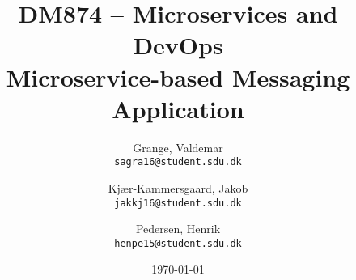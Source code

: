 \documentclass[12pt]{article}
\title{DM874 -- Microservices and DevOps \\ {\large Microservice-based Messaging Application}}
\date{\longdate\today}
\author{
  Grange, Valdemar \\ \texttt{sagra16@student.sdu.dk}
  \and 
  Kjær-Kammersgaard, Jakob \\ \texttt{jakkj16@student.sdu.dk}
  \and 
  Pedersen, Henrik \\ \texttt{henpe15@student.sdu.dk}
}
\begin{document}
\begin{titlepage}
    \begin{center}
        \vspace*{-2cm}\hspace*{1cm}
 
        \vspace{2.5cm}


        {\let\newpage\relax\maketitle}
        \thispagestyle{empty}

        \vspace{0.8cm}

        \begin{minipage}{.8\textwidth}
        
        \end{minipage}

    \end{center}
\end{titlepage}


\newpage

\setcounter{tocdepth}{2}
\tableofcontents
\newpage













\clearpage

\newpage

\end{document}
